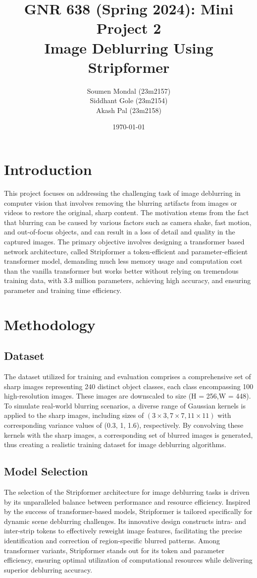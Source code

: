 \documentclass[12pt, a4paper, twoside]{article}
\title{\vspace{-0.5in}\textbf{GNR 638 (Spring 2024): Mini Project 2\\{\large Image Deblurring Using Stripformer}}}
\author{Soumen Mondal (23m2157)\\Siddhant Gole (23m2154)\\Akash Pal (23m2158)}
\date{\today}
\begin{document}
	\maketitle
	\thispagestyle{fancy}
	
	\section{Introduction}
		This project focuses on addressing the challenging task of image deblurring  in computer vision that involves removing the blurring artifacts from images or videos to restore the original, sharp content. The motivation stems from the fact that blurring can be caused by various factors such as camera shake, fast motion, and out-of-focus objects, and can result in a loss of detail and quality in the captured images. The primary objective involves designing a transformer based network architecture, called Stripformer a token-efficient and parameter-efficient transformer model, demanding much less memory usage and computation cost than the vanilla transformer but works better without relying on tremendous training data, with 3.3 million parameters, achieving high accuracy, and ensuring parameter and training time efficiency.
		
	\section{Methodology}
		\subsection{Dataset}
			The dataset utilized for training and evaluation comprises a comprehensive set of sharp images representing 240 distinct object classes, each class encompassing 100 high-resolution images. These images are downscaled to size (H = 256,W = 448). To simulate real-world blurring scenarios, a diverse range of Gaussian kernels is applied to the sharp images, including sizes of $(3 \times 3, 7 \times 7, 11 \times 11)$  with corresponding variance values of (0.3, 1, 1.6), respectively. By convolving these kernels with the sharp images, a corresponding set of blurred images is generated, thus creating a realistic training dataset for image deblurring algorithms. 
		
		\subsection{Model Selection}
		The selection of the Stripformer architecture for image deblurring tasks is driven by its unparalleled balance between performance and resource efficiency. Inspired by the success of transformer-based models, Stripformer is tailored specifically for dynamic scene deblurring challenges. Its innovative design constructs intra- and inter-strip tokens to effectively reweight image features, facilitating the precise identification and correction of region-specific blurred patterns. Among transformer variants, Stripformer stands out for its token and parameter efficiency, ensuring optimal utilization of computational resources while delivering superior deblurring accuracy.
			
\end{document}
